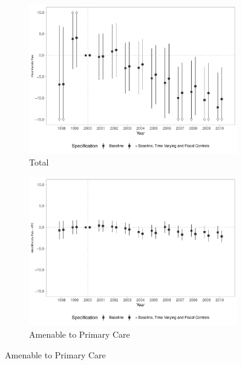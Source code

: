 \begin{figure}[h!]
    \begin{center}
    \caption{Effects on Infant Mortality Rates}\label{fig:15}
    \begin{subfigure}{0.32\textwidth}
        \caption{\scriptsize Total}\label{fig:15a}
        \centering
        \includegraphics[width=\textwidth]{plots/tx_mi_dist_ec29_baseline_dist_ec29_baseline_15.pdf}
    \end{subfigure}
    \begin{subfigure}{0.32\textwidth}
        \centering
        \caption{\scriptsize Amenable to Primary Care}\label{fig:15b}
        \includegraphics[width=\textwidth]{plots/tx_mi_icsap_dist_ec29_baseline_dist_ec29_baseline_15.pdf}
    \end{subfigure}

\end{center}
\end{figure}
